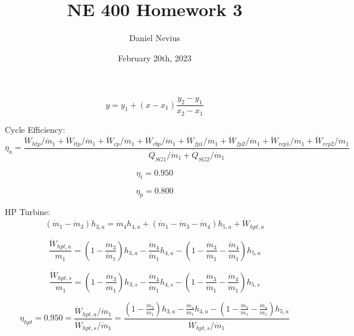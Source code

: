 \documentclass{article}
\title{NE 400 Homework 3}
\author{Daniel Nevius}
\date{February 20th, 2023}
\begin{document}
\maketitle

\section{}

\begin{equation}\label{interpolation}
y = y_1 + (x - x_1) \frac{y_2 - y_1}{x_2 - x_1}
\end{equation}


Cycle Efficiency:
\begin{equation}
\eta_{a} = \frac{\dot{W}_{htp    } / \dot{m}_{1} + \dot{W}_{ltp    } / \dot{m}_{1} + \dot{W}_{cp     } / \dot{m}_{1} + \dot{W}_{cbp    } / \dot{m}_{1} + \dot{W}_{fp1    } / \dot{m}_{1} + \dot{W}_{fp2    } / \dot{m}_{1} + \dot{W}_{rcp1   } / \dot{m}_{1} + \dot{W}_{rcp2   } / \dot{m}_{1}}{\dot{Q}_{SG1    } / \dot{m}_{1} + \dot{Q}_{SG2    } / \dot{m}_{1}}
\end{equation}

\begin{equation}
\eta_{t} =    0.950
\end{equation}

\begin{equation}
\eta_{p} =    0.800
\end{equation}


HP Turbine:
\begin{equation}
(\dot{m}_{ 1} - \dot{m}_{ 3})h_{ 3,a} = \dot{m}_{ 4}h_{ 4,a} + (\dot{m}_{ 1} - \dot{m}_{ 3} - \dot{m}_{ 4})h_{ 5,a} + \dot{W}_{hpt,a}
\end{equation}

\begin{equation}
\frac{\dot{W}_{hpt,a}}{m_1} = (1 - \frac{\dot{m}_{ 3}}{\dot{m}_{ 1}})h_{ 3,a} - \frac{\dot{m}_{ 4}}{\dot{m}_{ 1}}h_{ 4,a} - (1 - \frac{\dot{m}_{ 3}}{\dot{m}_{ 1}} - \frac{\dot{m}_{ 4}}{\dot{m}_{ 1}})h_{ 5,a}\end{equation}

\begin{equation}
\frac{\dot{W}_{hpt,s}}{m_1} = (1 - \frac{\dot{m}_{ 3}}{\dot{m}_{ 1}})h_{ 3,s} - \frac{\dot{m}_{ 4}}{\dot{m}_{ 1}}h_{ 4,s} - (1 - \frac{\dot{m}_{ 3}}{\dot{m}_{ 1}} - \frac{\dot{m}_{ 4}}{\dot{m}_{ 1}})h_{ 5,s}\end{equation}

\begin{equation}
\eta_{hpt} =    0.950 = \frac{\dot{W}_{hpt,a} / \dot{m}_{1}}{\dot{W}_{hpt,s} / \dot{m}_{1}} = \frac{
(1 - \frac{\dot{m}_{ 3}}{\dot{m}_{ 1}})h_{ 3,a} - \frac{\dot{m}_{ 4}}{\dot{m}_{ 1}}h_{ 4,a} - (1 - \frac{\dot{m}_{ 3}}{\dot{m}_{ 1}} - \frac{\dot{m}_{ 4}}{\dot{m}_{ 1}})h_{ 5,a}}{\dot{W}_{hpt,s} / \dot{m}_{1}}
\end{equation}
\end{document}
